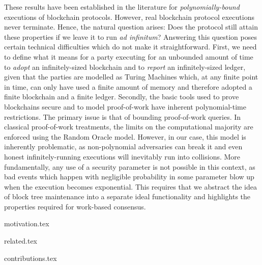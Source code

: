 These results have been established in the literature for
\emph{polynomially-bound} executions of blockchain protocols. However, real
blockchain protocol executions never terminate. Hence, the natural question
arises: Does the protocol still attain these properties if we leave it to run
\emph{ad infinitum}? Answering this question poses certain technical
difficulties which do not make it straightforward. First, we need to define
what it means for a party executing for an unbounded amount of time to \emph{adopt} an
infinitely-sized blockchain and to \emph{report} an infinitely-sized ledger,
given that the parties are modelled as Turing Machines which, at any finite
point in time, can only have used a finite amount of memory and therefore
adopted a finite blockchain and a finite ledger. Secondly, the basic tools used
to prove blockchains secure and to model proof-of-work have inherent
polynomial-time restrictions. The primary issue is that of
bounding proof-of-work queries. In classical proof-of-work treatments,
the limits on the computational majority are enforced using the Random Oracle
model. However, in our case, this model is inherently problematic, as
non-polynomial adversaries can break it and even honest infinitely-running
executions will inevitably run into collisions. More fundamentally, any use of a
security parameter is not possible in this context, as bad events which
happen with negligible probability in some parameter blow up when the execution
becomes exponential. This requires that we abstract the idea of block tree
maintenance into a separate ideal functionality and highlights the properties
required for work-based consensus.

{motivation.tex}

{related.tex}

{contributions.tex}
